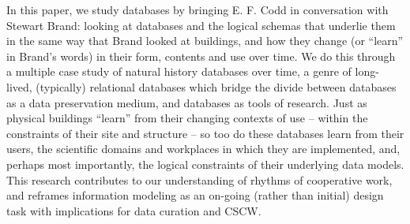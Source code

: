 In this paper, we study databases by bringing E. F. Codd in conversation with Stewart Brand: looking at databases and the logical schemas that underlie them in the same way that Brand looked at buildings, and how they change (or “learn” in Brand’s words) in their form, contents and use over time.  We do this through a multiple case study of natural history databases over time, a genre of long-lived, (typically) relational databases which bridge the divide between databases as a data preservation medium, and databases as tools of research.  Just as physical buildings “learn” from their changing contexts of use – within the constraints of their site and structure – so too do these databases learn from their users, the scientific domains and workplaces in which they are implemented, and, perhaps most importantly, the logical constraints of their underlying data models.  This research contributes to our understanding of rhythms of cooperative work, and reframes information modeling as an on-going (rather than initial) design task with implications for data curation and CSCW.